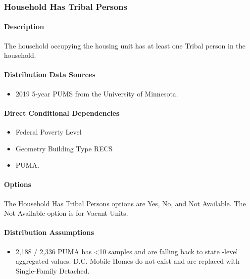 \subsubsection{Household Has Tribal
Persons}\label{household_has_tribal_persons}
\paragraph{Description}
The household occupying the housing unit has at least one Tribal person
in the household.

\paragraph{Distribution Data Sources}
\begin{itemize}
\item
  2019 5-year PUMS from the University of Minnesota.
\end{itemize}

\paragraph{Direct Conditional Dependencies}
\begin{itemize}
    \item Federal Poverty Level
    \item Geometry Building Type RECS
    \item PUMA.
\end{itemize}

\paragraph{Options}
The Household Has Tribal Persons options are Yes, No, and Not Available. The Not Available option is for Vacant Units.

\paragraph{Distribution Assumptions}
\begin{itemize}
\item
  2,188 / 2,336 PUMA has \textless10 samples and are falling back to state
-level aggregated values. D.C. Mobile Homes do not exist and are replaced
  with Single-Family Detached.
\end{itemize}

